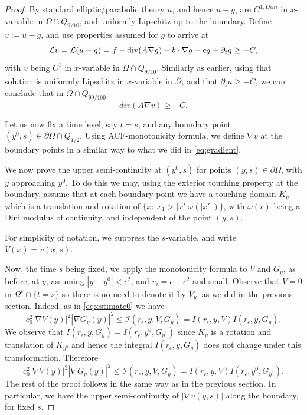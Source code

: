 \documentclass[11pt,reqno]{amsart}
\theoremstyle{plain}
\theoremstyle{remark}
\numberwithin{equation}{section}
\begin{document}
\begin{proof}
By standard elliptic/parabolic theory $u$, and hence $u-g$, are $C^{1,Dini}$ in $x$-variable in  $\Omega \cap Q_ {9/10}$, and uniformly Lipschitz up to the boundary. Define   $v:=u-g$, and use  properties assumed for $g$ to arrive at
$${\mathcal L}v = {\mathcal L}(u-g) = f  -\hbox{div} (A\nabla g  ) -b \cdot \nabla g - cg + \partial_t g 
\geq  - C ,
$$
with $v$ being $C^1$ in $x$-variable in  $\Omega \cap Q_ {9/10}$.
 Similarly as earlier, using that solution is uniformly Lipschitz  in $x$-variable in  $\overline \Omega$, and that $\partial_t u \geq -C$,  
 we can conclude that in $\Omega \cap Q_{99/100}$
\begin{equation}\label{eq:-C}
    div(A \nabla v)   \geq    -C.
\end{equation}


Let us now fix a time level, say $t=s$, and any  boundary point $(y^0,s) \in \partial \Omega \cap Q_{1/2}$. 
Using ACF-monotonicity formula, we define $\nabla v $ at the  boundary points in a similar way to what  we did in \eqref{eq:gradient}.

We now prove the upper semi-continuity at $(y^0,s)$
for points $(y,s) \in  \partial \Omega$, with $y$ approaching $y^0$. To do this we may, using the exterior touching property at the boundary, assume that at each boundary point we have a touching domain $K_y$ which is a translation and rotation of $\{ x: \ x_1 > |x'|\omega (|x'|)\}$, with $\omega (r)$ being a Dini modulus of continuity, and independent of the point $(y,s)$. 

For simplicity of notation, we suppress the $s$-variable, and 
write $V(x) = v(x,s)$.

Now, the time $s$ being fixed, we apply the monotonicity formula to  $V$ and $G_y$, as before, at $y$, assuming $|y - y^0|< \epsilon^2$,    and $r_\epsilon= \epsilon + \epsilon^2$ and small. Observe that $V =0 $ in $\Omega^c \cap \{t=s\}$ so there is no need to denote it by $V_y$, as we did in the previous section. Indeed, as in \eqref{eq:estimate0} we have 
\begin{equation*}
    c_0^2|\nabla V (y) |^2|\nabla G_y (y) |^2
\leq   \mathcal I(r_\epsilon,y,V,G_y) = I(r_\epsilon,y,V) I(r_\epsilon,y,G_y)  .
\end{equation*}
We observe that $I(r_\epsilon,y,G_y) = I(r_\epsilon,y^0,G_{y^0})$
since  
 $K_y$ is a rotation and translation of $K_{y^0}$ and hence the integral  $I(r_\epsilon,y,G_y)$ does not change under this transformation. Therefore 
\begin{equation}\label{eq:estimate3}
    c_0^2|\nabla V (y) |^2|\nabla G_y (y) |^2
\leq   \mathcal I(r_\epsilon,y,V,G_y) = I(r_\epsilon,y,V) I(r_\epsilon,y^0,G_{y^0})  .
\end{equation}
The rest of the proof follows in the same way as in the previous section. 
In particular, we have the  upper semi-continuity of $|\nabla v(y,s)|$ along the boundary, for fixed $s$.  


\end{proof}
\end{document}
